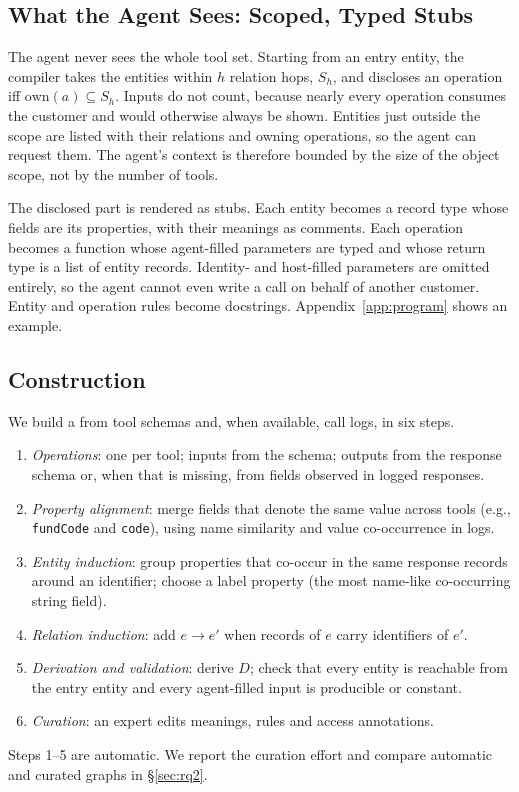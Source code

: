 \subsection{What the Agent Sees: Scoped, Typed Stubs}
\label{sec:disclosure}
The agent never sees the whole tool set. Starting from an entry entity, the compiler takes the entities within $h$ relation hops, $S_h$, and discloses an operation iff $\mathrm{own}(a)\subseteq S_h$. Inputs do not count, because nearly every operation consumes the customer and would otherwise always be shown. Entities just outside the scope are listed with their relations and owning operations, so the agent can request them. The agent's context is therefore bounded by the size of the object scope, not by the number of tools.

The disclosed part is rendered as \pyif stubs. Each entity becomes a record type whose fields are its properties, with their meanings as comments. Each operation becomes a function whose agent-filled parameters are typed and whose return type is a list of entity records. Identity- and host-filled parameters are omitted entirely, so the agent cannot even write a call on behalf of another customer. Entity and operation rules become docstrings. Appendix~\ref{app:program} shows an example.

\subsection{Construction}
\label{sec:construction}
We build a \sog from tool schemas and, when available, call logs, in six steps.
\begin{enumerate}
  \item \emph{Operations}: one per tool; inputs from the schema; outputs from the response schema or, when that is missing, from fields observed in logged responses.
  \item \emph{Property alignment}: merge fields that denote the same value across tools (e.g., \texttt{fundCode} and \texttt{code}), using name similarity and value co-occurrence in logs.
  \item \emph{Entity induction}: group properties that co-occur in the same response records around an identifier; choose a label property (the most name-like co-occurring string field).
  \item \emph{Relation induction}: add $e\to e'$ when records of $e$ carry identifiers of $e'$.
  \item \emph{Derivation and validation}: derive $D$; check that every entity is reachable from the entry entity and every agent-filled input is producible or constant.
  \item \emph{Curation}: an expert edits meanings, rules and access annotations.
\end{enumerate}
Steps 1--5 are automatic. We report the curation effort and compare automatic and curated graphs in \S\ref{sec:rq2}. 
